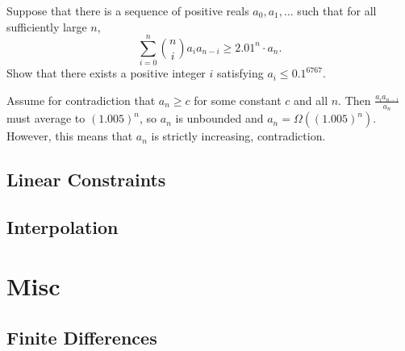 \documentclass[11pt]{scrartcl}
\theoremstyle{plain} %
\theoremstyle{definition}
\theoremstyle{remark}
\theoremstyle{empty}
\theoremstyle{empty}
\theoremstyle{empty}
\theoremstyle{empty}
\theoremstyle{empty}
\theoremstyle{empty}
\theoremstyle{empty}
\begin{document}
\begin{problem}
  Suppose that there is a sequence of positive reals $a_0,a_1,\dots$ such that for all sufficiently large $n$,$$\sum_{i=0}^n\binom{n}{i}a_ia_{n-i}\ge 2.01^n\cdot a_n.$$Show that there exists a positive integer $i$ satisfying $a_i\le 0.1^{6767}$.
\end{problem}

\begin{solution}
  Assume for contradiction that $a_n \ge c$ for some constant $c$ and all $n$. Then $\frac{a_i a_{n-i}}{a_n}$ must average to $(1.005)^n$, so $a_n$ is unbounded and $a_n = \Omega((1.005)^n)$. However, this means that $a_n$ is strictly increasing, contradiction. 
\end{solution}

\subsection{Linear Constraints}

\subsection{Interpolation}




\section{Misc}

\subsection{Finite Differences}

\begin{problem}[2023 Putnam A5]
  
\end{problem}
\end{document}
